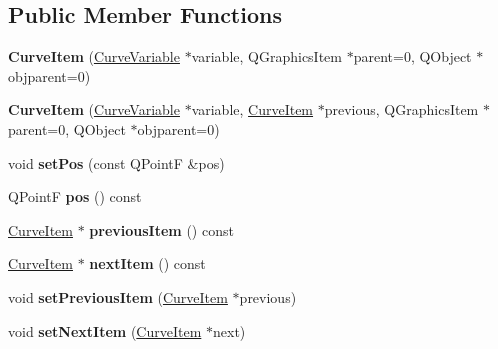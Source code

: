 \subsection*{\-Public \-Member \-Functions}
\begin{DoxyCompactItemize}
\item 
\hypertarget{class_curve_item_a3776ded2ef85a9404bae91401f135186}{
{\bfseries \-Curve\-Item} (\hyperlink{class_curve_variable}{\-Curve\-Variable} $\ast$variable, \-Q\-Graphics\-Item $\ast$parent=0, \-Q\-Object $\ast$objparent=0)}
\label{class_curve_item_a3776ded2ef85a9404bae91401f135186}

\item 
\hypertarget{class_curve_item_a81f5dc3ba8f16ab7c33767c45cf3674e}{
{\bfseries \-Curve\-Item} (\hyperlink{class_curve_variable}{\-Curve\-Variable} $\ast$variable, \hyperlink{class_curve_item}{\-Curve\-Item} $\ast$previous, \-Q\-Graphics\-Item $\ast$parent=0, \-Q\-Object $\ast$objparent=0)}
\label{class_curve_item_a81f5dc3ba8f16ab7c33767c45cf3674e}

\item 
\hypertarget{class_curve_item_acd479a4a78ba9640661dd0a2e883f313}{
void {\bfseries set\-Pos} (const \-Q\-Point\-F \&pos)}
\label{class_curve_item_acd479a4a78ba9640661dd0a2e883f313}

\item 
\hypertarget{class_curve_item_a1f0382e57b7064168a4c3077e183a7ee}{
\-Q\-Point\-F {\bfseries pos} () const }
\label{class_curve_item_a1f0382e57b7064168a4c3077e183a7ee}

\item 
\hypertarget{class_curve_item_a67cf05763ff8007d88ba02e90d8a8260}{
\hyperlink{class_curve_item}{\-Curve\-Item} $\ast$ {\bfseries previous\-Item} () const }
\label{class_curve_item_a67cf05763ff8007d88ba02e90d8a8260}

\item 
\hypertarget{class_curve_item_ab75b74d9706fb49131f55dae96dfcac2}{
\hyperlink{class_curve_item}{\-Curve\-Item} $\ast$ {\bfseries next\-Item} () const }
\label{class_curve_item_ab75b74d9706fb49131f55dae96dfcac2}

\item 
\hypertarget{class_curve_item_a35804c0dbb4136e655008e52befd4396}{
void {\bfseries set\-Previous\-Item} (\hyperlink{class_curve_item}{\-Curve\-Item} $\ast$previous)}
\label{class_curve_item_a35804c0dbb4136e655008e52befd4396}

\item 
\hypertarget{class_curve_item_a3fe749bc2f644abc7231d7ac892a872e}{
void {\bfseries set\-Next\-Item} (\hyperlink{class_curve_item}{\-Curve\-Item} $\ast$next)}
\label{class_curve_item_a3fe749bc2f644abc7231d7ac892a872e}


\end{DoxyCompactItemize}

